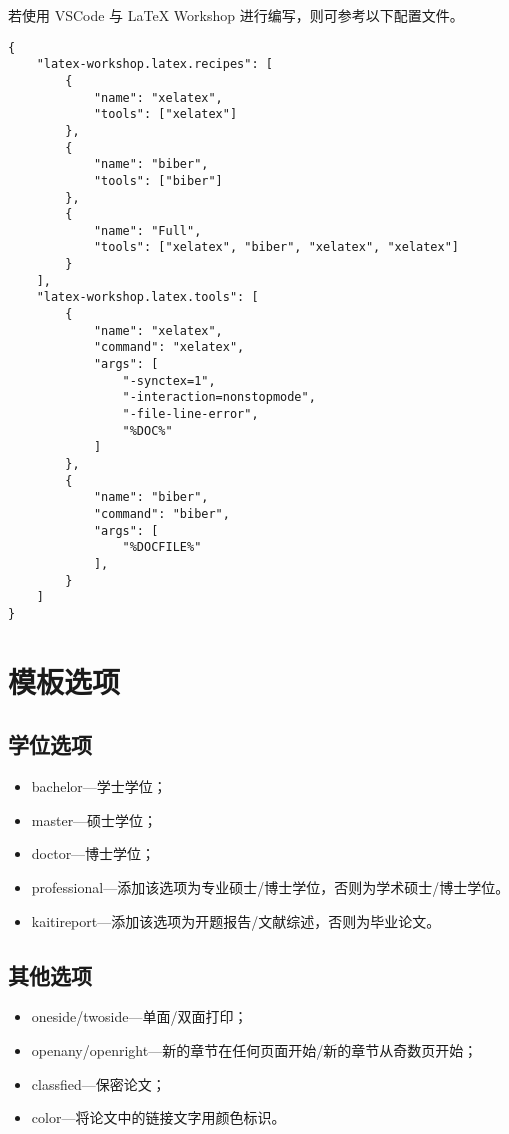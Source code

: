 若使用 VSCode 与 LaTeX Workshop 进行编写，则可参考以下配置文件。
\begin{lstlisting}[caption={LaTeX Workshop 配置}]
{
    "latex-workshop.latex.recipes": [
        {
            "name": "xelatex",
            "tools": ["xelatex"]
        },
        {
            "name": "biber",
            "tools": ["biber"]
        },
        {
            "name": "Full",
            "tools": ["xelatex", "biber", "xelatex", "xelatex"]
        }
    ],
    "latex-workshop.latex.tools": [
        {
            "name": "xelatex",
            "command": "xelatex",
            "args": [
                "-synctex=1",
                "-interaction=nonstopmode",
                "-file-line-error",
                "%DOC%"
            ]
        },
        {
            "name": "biber",
            "command": "biber",
            "args": [
                "%DOCFILE%"
            ],
        }
    ]
}
\end{lstlisting}

\section{模板选项}
\subsection{学位选项}
    \begin{itemize}
        \item bachelor---学士学位；
        \item master---硕士学位；
        \item doctor---博士学位；
        \item professional---添加该选项为专业硕士\slash 博士学位，否则为学术硕士\slash 博士学位。
        \item kaitireport---添加该选项为开题报告\slash 文献综述，否则为毕业论文。
    \end{itemize}

\subsection{其他选项}
    \begin{itemize}
        \item oneside\slash twoside---单面\slash 双面打印；
        \item openany\slash openright---新的章节在任何页面开始\slash 新的章节从奇数页开始；
        \item classfied---保密论文；
        \item color---将论文中的链接文字用颜色标识。
    \end{itemize}

